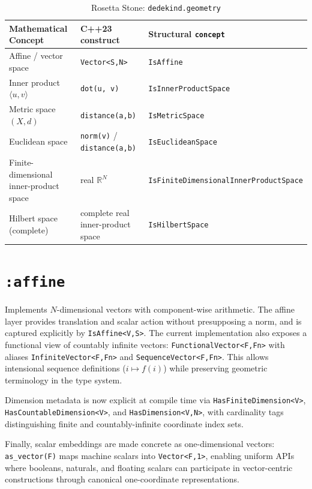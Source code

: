 \documentclass[11pt, a4paper]{report}
\begin{document}
\begin{table}[ht]
\centering
\caption{Rosetta Stone: \texttt{dedekind.geometry}}
\label{table:geometry}
\begin{tabular}{lll}
\toprule
\textbf{Mathematical Concept} & \textbf{C++23 construct} & \textbf{Structural \texttt{concept}} \\
\midrule
Affine / vector space & \texttt{Vector<S,N>} & \texttt{IsAffine} \\
Inner product $\langle u, v \rangle$ & \texttt{dot(u, v)} & \texttt{IsInnerProductSpace} \\
Metric space $(X,d)$ & \texttt{distance(a,b)} & \texttt{IsMetricSpace} \\
Euclidean space & \texttt{norm(v)} / \texttt{distance(a,b)} & \texttt{IsEuclideanSpace} \\
Finite-dimensional inner-product space & real $\mathbb{R}^N$ & \texttt{IsFiniteDimensionalInnerProductSpace} \\
Hilbert space (complete) & complete real inner-product space & \texttt{IsHilbertSpace} \\
\bottomrule
\end{tabular}
\end{table}

\section{\texttt{:affine}}
\label{sec:geometry-affine}

Implements $N$-dimensional vectors with component-wise arithmetic. The affine layer provides translation and scalar action without presupposing a norm, and is captured explicitly by \texttt{IsAffine<V,S>}.
The current implementation also exposes a functional view of countably infinite vectors:
\texttt{FunctionalVector<F,Fn>} with aliases \texttt{InfiniteVector<F,Fn>} and
\texttt{SequenceVector<F,Fn>}. This allows intensional sequence definitions
($i \mapsto f(i)$) while preserving geometric terminology in the type system.

Dimension metadata is now explicit at compile time via
\texttt{HasFiniteDimension<V>}, \texttt{HasCountableDimension<V>}, and
\texttt{HasDimension<V,N>}, with cardinality tags distinguishing finite and
countably-infinite coordinate index sets.

Finally, scalar embeddings are made concrete as one-dimensional vectors:
\texttt{as\_vector(F)} maps machine scalars into \texttt{Vector<F,1>}, enabling
uniform APIs where booleans, naturals, and floating scalars can participate in
vector-centric constructions through canonical one-coordinate representations.
\end{document}
